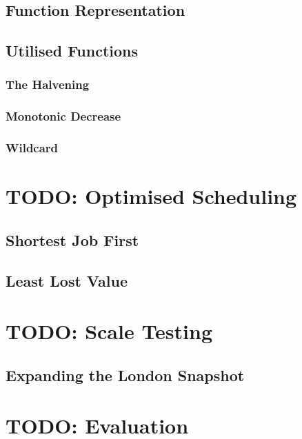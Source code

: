 \documentclass[a4paper,12pt,titlepage]{article}
\begin{document}
\subsection{Function Representation}

\subsection{Utilised Functions}
\subsubsection{The Halvening}
\subsubsection{Monotonic Decrease}
\subsubsection{Wildcard}

\newpage
\section{TODO: Optimised Scheduling}
\subsection{Shortest Job First}
\subsection{Least Lost Value}

\newpage
\section{TODO: Scale Testing}
\subsection{Expanding the London Snapshot}
\subsection{}


\newpage
\section{TODO: Evaluation}
\end{document}
